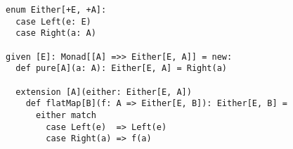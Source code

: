 \begin{algorithm}

\begin{verbatim}
enum Either[+E, +A]:
  case Left(e: E)
  case Right(a: A)

given [E]: Monad[[A] =>> Either[E, A]] = new:
  def pure[A](a: A): Either[E, A] = Right(a)

  extension [A](either: Either[E, A])
    def flatMap[B](f: A => Either[E, B]): Either[E, B] =
      either match
        case Left(e)  => Left(e)
        case Right(a) => f(a)
\end{verbatim}

\caption{Either monad in Scala %
\label{monad:either}}
\end{algorithm}